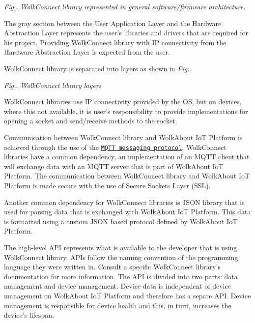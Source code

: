 \begin{center}  {\itshape Fig.. Wolk\+Connect library represented in general software/firmware architecture.}\end{center} 

The gray section between the User Application Layer and the Hardware Abstraction Layer represents the user’s libraries and drivers that are required for his project. Providing Wolk\+Connect library with IP connectivity from the Hardware Abstraction Layer is expected from the user.

Wolk\+Connect library is separated into layers as shown in {\itshape Fig..} \begin{center}  {\itshape Fig.. Wolk\+Connect library layer\textquotesingle{}s} \end{center} 

Wolk\+Connect libraries use IP connectivity provided by the OS, but on devices, where this not available, it is user’s responsibility to provide implementations for opening a socket and send/receive methods to the socket.

Communication between Wolk\+Connect library and Wolk\+About IoT Platform is achieved through the use of the \href{http://mqtt.org/}{\tt M\+Q\+TT messaging protocol}. Wolk\+Connect libraries have a common dependency, an implementation of an M\+Q\+TT client that will exchange data with an M\+Q\+TT server that is part of Wolk\+About IoT Platform. The communication between Wolk\+Connect library and Wolk\+About IoT Platform is made secure with the use of Secure Sockets Layer (S\+SL).

Another common dependency for Wolk\+Connect libraries is J\+S\+ON library that is used for parsing data that is exchanged with Wolk\+About IoT Platform. This data is formatted using a custom J\+S\+ON based protocol defined by Wolk\+About IoT Platform.

The high-\/level A\+PI represents what is available to the developer that is using Wolk\+Connect library. A\+P\+Is follow the naming convention of the programming language they were written in. Consult a specific Wolk\+Connect library’s documentation for more information. The A\+PI is divided into two parts\+: data management and device management. Device data is independent of device management on Wolk\+About IoT Platform and therefore has a separe A\+PI. Device management is responsible for device health and this, in turn, increases the device’s lifespan.

